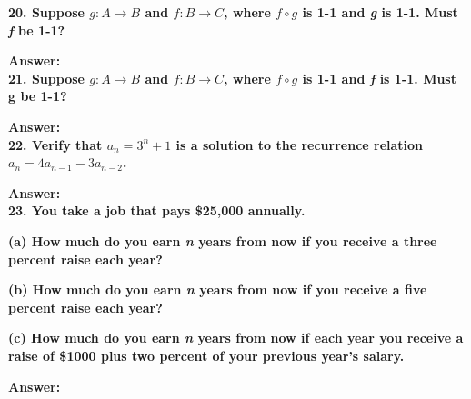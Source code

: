 \documentclass{article}
\begin{document}
\begin{large}
\textbf{20. Suppose $g:A\to B$ and $f:B\to C$, where $f\circ g$ is 1-1 and \emph{g} is 1-1. Must \emph{f} be 1-1?}

\textbf{Answer:} \\





\textbf{21. Suppose $g:A\to B$ and $f:B\to C$, where $f\circ g$ is 1-1 and \emph{f} is 1-1. Must g be 1-1?}

\textbf{Answer:} \\




\textbf{22. Verify that $a_{n}={3^{n}+1}$ is a solution to the recurrence relation $a_{n}=4a_{n-1}-3a_{n-2}$.}

\textbf{Answer:} \\





\textbf{23. You take a job that pays \$25,000 annually.}

\textbf{(a) How much do you earn \emph{n} years from now if you receive a three percent raise each year?}

\textbf{(b) How much do you earn \emph{n} years from now if you receive a five percent raise each year? }

\textbf{(c) How much do you earn \emph{n} years from now if each year you receive a raise of \$1000 plus two percent of your previous year's salary.}

\textbf{Answer:} \\








\end{large}
\end{document}
